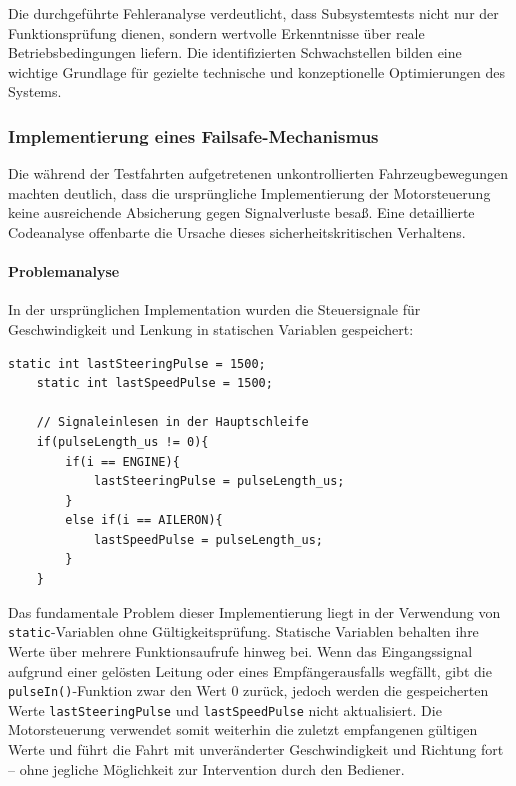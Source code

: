 Die durchgeführte Fehleranalyse verdeutlicht, dass Subsystemtests nicht nur der Funktionsprüfung dienen, sondern wertvolle Erkenntnisse über reale Betriebsbedingungen liefern. Die identifizierten Schwachstellen bilden eine wichtige Grundlage für gezielte technische und konzeptionelle Optimierungen des Systems.


\subsubsection{Implementierung eines Failsafe-Mechanismus}

Die während der Testfahrten aufgetretenen unkontrollierten Fahrzeugbewegungen machten deutlich, dass die ursprüngliche Implementierung der Motorsteuerung keine ausreichende Absicherung gegen Signalverluste besaß. Eine detaillierte Codeanalyse offenbarte die Ursache dieses sicherheitskritischen Verhaltens.

\paragraph{Problemanalyse}
In der ursprünglichen Implementation wurden die Steuersignale für Geschwindigkeit und Lenkung in statischen Variablen gespeichert:

\begin{lstlisting}[style=motorStyle, caption={Problematische Signalspeicherung ohne Validierung}]
	static int lastSteeringPulse = 1500;
	static int lastSpeedPulse = 1500;
	
	// Signaleinlesen in der Hauptschleife
	if(pulseLength_us != 0){ 
		if(i == ENGINE){
			lastSteeringPulse = pulseLength_us;
		}
		else if(i == AILERON){
			lastSpeedPulse = pulseLength_us;
		}
	}
\end{lstlisting}

Das fundamentale Problem dieser Implementierung liegt in der Verwendung von \texttt{static}-Variablen ohne Gültigkeitsprüfung. Statische Variablen behalten ihre Werte über mehrere Funktionsaufrufe hinweg bei. Wenn das Eingangssignal aufgrund einer gelösten Leitung oder eines Empfängerausfalls wegfällt, gibt die \texttt{pulseIn()}-Funktion zwar den Wert 0 zurück, jedoch werden die gespeicherten Werte \texttt{lastSteeringPulse} und \texttt{lastSpeedPulse} nicht aktualisiert. Die Motorsteuerung verwendet somit weiterhin die zuletzt empfangenen gültigen Werte und führt die Fahrt mit unveränderter Geschwindigkeit und Richtung fort -- ohne jegliche Möglichkeit zur Intervention durch den Bediener.

